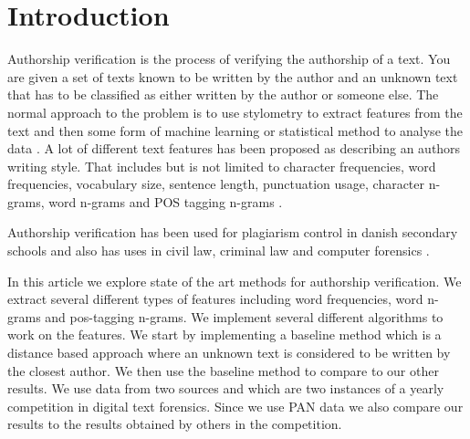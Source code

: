 \section{Introduction}
Authorship verification is the process of verifying the authorship of a text.
You are given a set of texts known to be written by the author and an unknown
text that has to be classified as either written by the author or someone else.
The normal approach to the problem is to use stylometry to extract features from
the text and then some form of machine learning or statistical method to analyse
the data \cite{stamatos2009}. A lot of different text features has been proposed
as describing an authors writing style. That includes but is not limited to
character frequencies, word frequencies, vocabulary size, sentence length,
punctuation usage, character n-grams, word n-grams and \gls{POS} tagging n-grams
\cite{stamatos2009}.

Authorship verification has been used for plagiarism control in danish secondary
schools \cite{hansen2014} and also has uses in civil law, criminal law and
computer forensics \cite{stamatos2009}.

In this article we explore state of the art methods for authorship verification.
We extract several different types of features including word frequencies, word
n-grams and pos-tagging n-grams. We implement several different algorithms to
work on the features. We start by implementing a baseline method which is a
distance based approach where an unknown text is considered to be written by
the closest author. We then use the baseline method to compare to our other
results. We use data from two sources \cite{pan:2015} and \cite{pan:2013} which
are two instances of a yearly competition in digital text forensics. Since we
use PAN data we also compare our results to the results obtained by others in
the competition.

